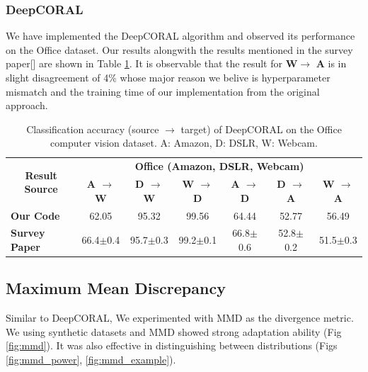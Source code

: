 \documentclass{article}
\begin{document}
\subsubsection{DeepCORAL}
We have implemented the DeepCORAL algorithm and observed its performance on the Office dataset. Our results alongwith the results mentioned in the survey paper[\cite{DeepCoral}] are shown in Table \ref{tab:deepcoral}. It is observable that the result for \textbf{W}$\rightarrow$ \textbf{A} is in slight disagreement of 4\% whose major reason we belive is hyperparameter mismatch and the training time of our implementation from the original approach.
 
\begin{table}
  \caption{Classification accuracy (source $\rightarrow$ target) of DeepCORAL on the Office computer vision dataset. A: Amazon, D: DSLR, W: Webcam.}
  \label{comparePerformance2}
  \begin{scriptsize}
  \begin{center}
  {\renewcommand{\arraystretch}{1.4}
  \begin{tabular}{@{}l cccccc@{}}
  \toprule
  \multicolumn{1}{c}{\multirow{2}{*}{\textbf{Result Source}}} & \multicolumn{6}{c}{\textbf{Office (Amazon, DSLR, Webcam)}} \\
  \cmidrule{2-7}
   & \textbf{A $\rightarrow$ W} & \textbf{D $\rightarrow$ W} & \textbf{W $\rightarrow$ D} & \textbf{A $\rightarrow$ D} & \textbf{D $\rightarrow$ A} & \textbf{W $\rightarrow$ A} \\
  \midrule
  \textbf{Our Code} & 62.05 & 95.32 & 99.56 & 64.44 & 52.77 & 56.49\\
  \hline
  \textbf{Survey Paper} & 66.4$\pm$0.4 & 95.7$\pm$0.3 & 99.2$\pm$0.1 & 66.8$\pm$0.6 & 52.8$\pm$0.2 & 51.5$\pm$0.3\\
  \bottomrule
  \end{tabular}
  }
  \end{center}
  \end{scriptsize}
  \label{tab:deepcoral}
\end{table}

\subsection{Maximum Mean Discrepancy}
Similar to DeepCORAL\cite{DeepCoral}, We experimented with MMD as the divergence metric. We using synthetic datasets and MMD showed strong adaptation ability (Fig \ref{fig:mmd}). It was also effective in  distinguishing between distributions (Figs \ref{fig:mmd_power}, \ref{fig:mmd_example}).
\end{document}

